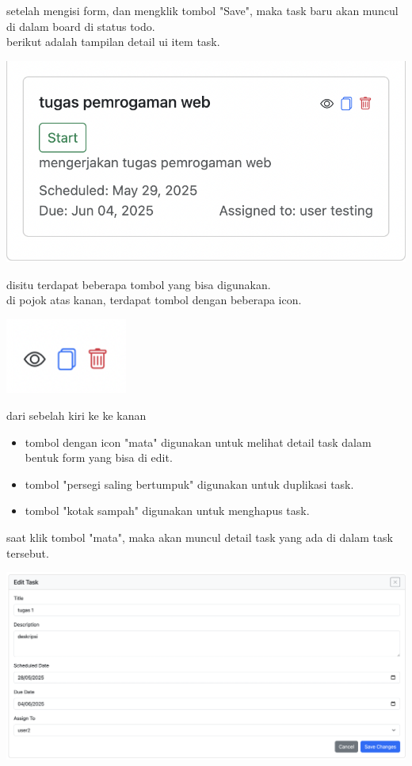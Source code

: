 setelah mengisi form, dan mengklik tombol "Save", maka task baru akan muncul di dalam board di status todo.
\\ berikut adalah tampilan detail ui item task.
\begin{center}
  \includegraphics[width=1\textwidth]{assets/ui/task_board_item.png}
\end{center}
disitu terdapat beberapa tombol yang bisa digunakan.
\\ di pojok atas kanan, terdapat tombol dengan beberapa icon.
\begin{center}
  \includegraphics[width=0.3\textwidth]{assets/ui/task_board_item_actions.png}
\end{center}
dari sebelah kiri ke ke kanan
\begin{itemize}
  \item tombol dengan icon "mata" digunakan untuk melihat detail task dalam bentuk form yang bisa di edit.
  \item tombol "persegi saling bertumpuk" digunakan untuk duplikasi task.
  \item tombol "kotak sampah" digunakan untuk menghapus task.
\end{itemize}
saat klik tombol "mata", maka akan muncul detail task yang ada di dalam task tersebut.
\begin{center}
  \includegraphics[width=1\textwidth]{assets/ui/board_task_edit.png}
\end{center}
